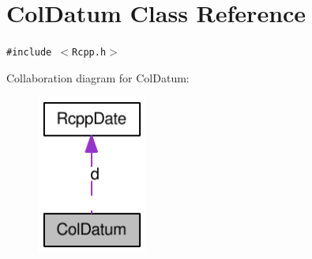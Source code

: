 \hypertarget{classColDatum}{
\section{ColDatum Class Reference}
\label{classColDatum}
}
{\tt \#include $<$Rcpp.h$>$}

Collaboration diagram for ColDatum:\nopagebreak
\begin{figure}[H]
\begin{center}
\leavevmode
\includegraphics[width=102pt]{classColDatum__coll__graph}
\end{center}
\end{figure}
